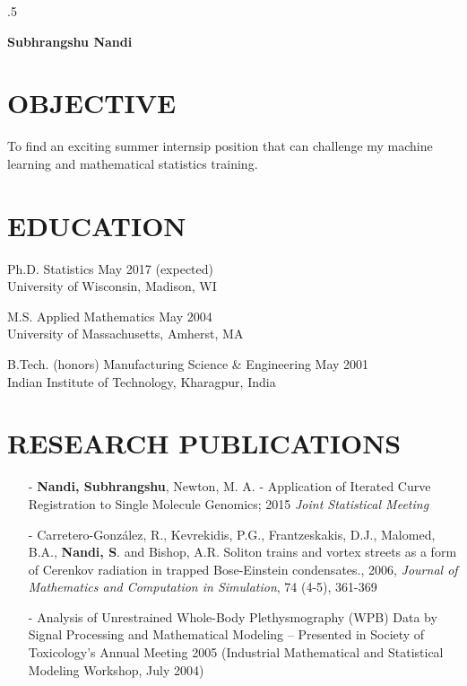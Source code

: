 \documentclass[11pt]{res} %
\begin{document}
 
\thispagestyle{empty} %

\moveleft.5\hoffset\centerline{\large\bf Subhrangshu Nandi}
\address{1300 University Ave, Suite 1250D \\   Madison, WI 53706  \\ (413) 530-1400}
\address{snandi@wisc.edu \\ nands31@gmail.com  \\ www.linkedin.com/in/nands31}
                                             
\begin{resume}
 
\section{OBJECTIVE}
To find an exciting summer internsip position that can challenge my machine learning and mathematical statistics training.
 
\section{EDUCATION} 
Ph.D. Statistics \hfill May 2017 (expected)\\
\noindent University of Wisconsin, Madison, WI

M.S. Applied Mathematics \hfill May 2004 \\
\noindent University of Massachusetts, Amherst, MA

B.Tech. (honors) Manufacturing Science \& Engineering \hfill May 2001 \\
\noindent Indian Institute of Technology, Kharagpur, India

\section{RESEARCH PUBLICATIONS} 
\begin{itemize}[leftmargin=*]
\item[-] {\bf{Nandi, Subhrangshu}}, Newton, M. A. - Application of Iterated Curve Registration to Single
Molecule Genomics; 2015 {\emph{Joint Statistical Meeting}}
\item[-] Carretero-González, R., Kevrekidis, P.G., Frantzeskakis, D.J., Malomed, B.A., {\bf{Nandi, S}}. and
Bishop, A.R. Soliton trains and vortex streets as a form of Cerenkov radiation in trapped
Bose-Einstein condensates., 2006, {\emph{Journal of Mathematics and Computation in
Simulation}}, 74 (4-5), 361-369
\item[-] Analysis of Unrestrained Whole-Body Plethysmography (WPB) Data by Signal Processing and
Mathematical Modeling – Presented in Society of Toxicology’s Annual Meeting 2005
(Industrial Mathematical and Statistical Modeling Workshop, July 2004)
\end{itemize}


\end{resume}
\end{document}
